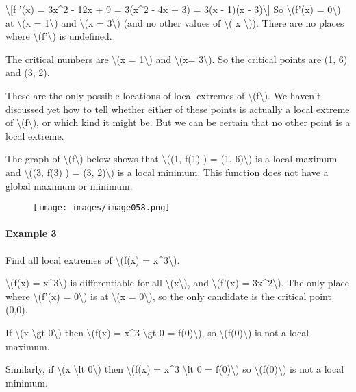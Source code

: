 \textbackslash{}{[}f '(x) = 3x\^{}2 - 12x + 9 = 3(x\^{}2 - 4x + 3) = 3(x
- 1)(x - 3)\textbackslash{}{]} So \textbackslash{}(f'(x) =
0\textbackslash{}) at \textbackslash{}(x = 1\textbackslash{}) and
\textbackslash{}(x = 3\textbackslash{}) (and no other values of
\textbackslash{}( x \textbackslash{})). There are no places where
\textbackslash{}(f'\textbackslash{}) is undefined.

The critical numbers are \textbackslash{}(x = 1\textbackslash{}) and
\textbackslash{}(x= 3\textbackslash{}). So the critical points are (1,
6) and (3, 2).

These are the only possible locations of local extremes of
\textbackslash{}(f\textbackslash{}). We haven't discussed yet how to
tell whether either of these points is actually a local extreme of
\textbackslash{}(f\textbackslash{}), or which kind it might be. But we
can be certain that no other point is a local extreme.

The graph of \textbackslash{}(f\textbackslash{}) below shows that
\textbackslash{}((1, f(1) ) = (1, 6)\textbackslash{}) is a local maximum
and \textbackslash{}((3, f(3) ) = (3, 2)\textbackslash{}) is a local
minimum. This function does not have a global maximum or minimum.

\begin{figure}
\centering
\texttt{[image: images/image058.png]}
\caption{}
\end{figure}

\hypertarget{example-3}{%
\paragraph{Example 3}\label{example-3}}

Find all local extremes of \textbackslash{}(f(x) =
x\^{}3\textbackslash{}).

\textbackslash{}(f(x) = x\^{}3\textbackslash{}) is differentiable for
all \textbackslash{}(x\textbackslash{}), and \textbackslash{}(f'(x) =
3x\^{}2\textbackslash{}). The only place where \textbackslash{}(f'(x) =
0\textbackslash{}) is at \textbackslash{}(x = 0\textbackslash{}), so the
only candidate is the critical point (0,0).

If \textbackslash{}(x \textbackslash{}gt 0\textbackslash{}) then
\textbackslash{}(f(x) = x\^{}3 \textbackslash{}gt 0 =
f(0)\textbackslash{}), so \textbackslash{}(f(0)\textbackslash{}) is not
a local maximum.

Similarly, if \textbackslash{}(x \textbackslash{}lt 0\textbackslash{})
then \textbackslash{}(f(x) = x\^{}3 \textbackslash{}lt 0 =
f(0)\textbackslash{}) so \textbackslash{}(f(0)\textbackslash{}) is not a
local minimum.

